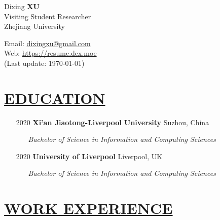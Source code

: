 \documentclass[11pt]{article}
\begin{document}
\begin{minipage}[t]{0.65\textwidth}
    {\Huge Dixing \bf{XU}} \\
    Visiting Student Researcher \\
    Zhejiang University\\
\end{minipage}
\begin{minipage}[t]{0.45\textwidth}
    {\small\raggedright
    Email: \href{mailto:dixingxu@gmail.com}{dixingxu@gmail.com} \\
    Web: \href{https://resume.dex.moe}{https://resume.dex.moe} \\
    (Last update: \today)
    }
\end{minipage}


\section*{\centering\underline{EDUCATION}}
\begin{itemize}[noitemsep, nolistsep]
    \large \item[2020] \textbf{Xi'an Jiaotong-Liverpool University} \hfill Suzhou, China
        \begin{itemize}
            \item[] \textit{Bachelor of Science in Information and Computing Sciences}
        \end{itemize} 
    \item[2020] \large\textbf{University of Liverpool} \hfill Liverpool, UK
        \begin{itemize}
            \item[] \textit{Bachelor of Science in Information and Computing Sciences}
        \end{itemize} 
\end{itemize}

\section*{\centering\underline{WORK EXPERIENCE}}
\end{document}
